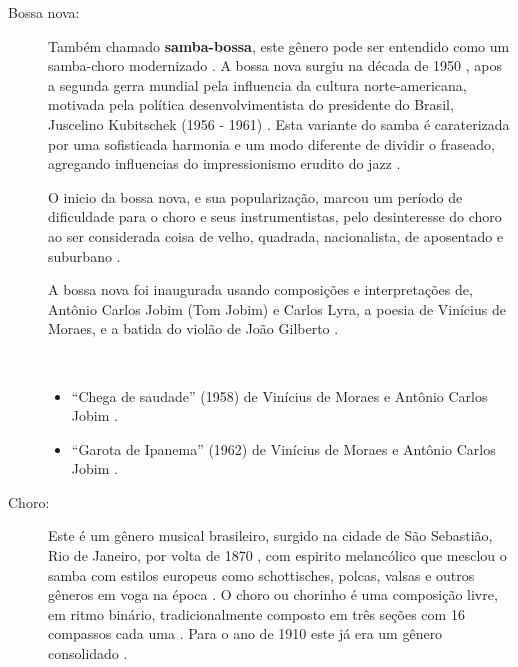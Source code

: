 \begin{description}



\item[Bossa nova:] 
Também chamado \textbf{samba-bossa}, este gênero pode ser entendido como um samba-choro modernizado \cite[pp. 63]{reinato2010musica}.
A bossa nova surgiu  na década de 1950 \cite[pp. 130]{perna2002samba},
apos a segunda gerra mundial pela influencia da cultura norte-americana, motivada 
pela política desenvolvimentista do presidente do Brasil, Juscelino Kubitschek (1956 - 1961) \cite[pp. 15]{de2003tem}.
Esta variante do samba é caraterizada por uma sofisticada harmonia e um modo diferente de dividir o fraseado, 
agregando influencias do impressionismo erudito do jazz  \cite[pp. 130]{perna2002samba} \cite[pp. 15]{de2003tem}. 

O inicio da bossa nova, e sua popularização, 
marcou um período de dificuldade para o choro e seus instrumentistas,
pelo desinteresse  do choro ao ser considerada coisa de velho, quadrada, nacionalista, de aposentado e suburbano \cite{rizzi2016musica}.

A bossa nova foi inaugurada usando composições e interpretações de, Antônio Carlos Jobim (Tom Jobim) e Carlos Lyra,
a poesia de Vinícius de Moraes, e
a batida do violão de João Gilberto \cite[pp. 130]{perna2002samba}  \cite[pp. 15]{de2003tem}.
\begin{example} ~

\begin{itemize}
\item ``Chega de saudade'' (1958) de Vinícius de Moraes e Antônio Carlos Jobim \cite{castro2016chega} \cite{tomjobim}.
\item ``Garota de Ipanema'' (1962) de Vinícius de Moraes e Antônio Carlos Jobim \cite{tomjobim}.
\end{itemize}
\end{example}

\item[Choro:] 
Este é um gênero musical brasileiro, surgido na cidade de São Sebastião, Rio de Janeiro, por volta de 1870 \cite[pp. 14]{diniz2003almanaque} \cite[pp. 132]{perna2002samba} \cite[pp. 64]{reinato2010musica},
com espirito melancólico que mesclou o samba com  estilos europeus como schottisches, polcas,
valsas e outros gêneros em voga na época  \cite[pp. 64]{reinato2010musica} \cite[pp. 79]{dourado2004dicionario} \cite[pp. 132]{perna2002samba}.
O choro ou chorinho é uma composição livre, em ritmo binário, 
tradicionalmente composto em três seções com 16 compassos cada uma \cite[pp. 64]{reinato2010musica}.
Para o ano de 1910 este já era um gênero consolidado \cite[pp. 12]{diniz2003almanaque}.


\end{description}
